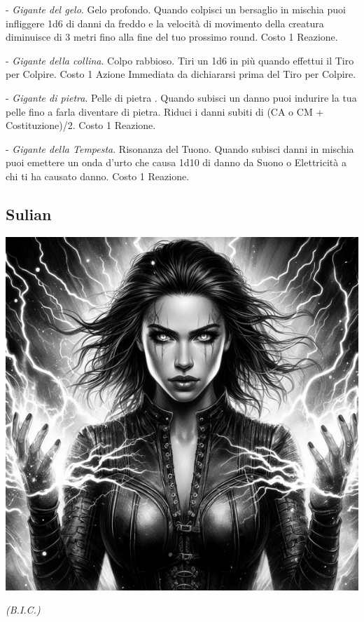 \begin{multicols}{2}
- \emph{Gigante del gelo}. Gelo profondo. Quando colpisci un bersaglio in mischia puoi infliggere 1d6 di danni da freddo e la velocità di movimento della creatura diminuisce di 3 metri fino alla fine del tuo prossimo round. Costo 1 Reazione.

- \emph{Gigante della collina}. Colpo rabbioso. Tiri un 1d6 in più quando effettui il Tiro per Colpire. Costo 1 Azione Immediata da dichiararsi prima del Tiro per Colpire.

- \emph{Gigante di pietra}. Pelle di pietra . Quando subisci un danno puoi indurire la tua pelle fino a farla diventare di pietra. Riduci i danni subiti di (CA o CM + Costituzione)/2. Costo 1 Reazione.

- \emph{Gigante della Tempesta}. Risonanza del Tuono. Quando subisci danni in mischia puoi emettere un onda d'urto che causa 1d10 di danno da Suono o Elettricità a chi ti ha causato danno. Costo 1 Reazione.

\subsection{Sulian}\label{sulian}\hypertarget{sulian}{}

\begin{center}

\includegraphics[width=0.7\linewidth]{immagini/sulian4-ai.png}

\emph{(B.I.C.)}

\end{center}

%


\end{multicols}
